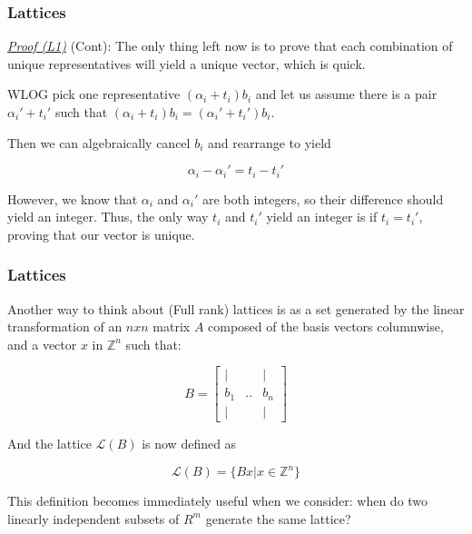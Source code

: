 \documentclass{beamer}
\begin{document}
\begin{frame}
\frametitle{Lattices}
\underline{\textit{Proof (L1)}} (Cont): The only thing left now is to prove that each combination of unique representatives will yield a unique vector, which is quick.

\vspace{1em}

WLOG pick one representative $(\alpha_i + t_i) b_i$ and let us assume there is a pair $\alpha_i' + t_i'$ such that $(\alpha_i + t_i) b_i = (\alpha_i' + t_i') b_i$.

\vspace{1em}

Then we can algebraically cancel $b_i$ and rearrange to yield

\[ \alpha_i - \alpha_i' = t_i - t_i' \]

However, we know that $\alpha_i$ and $\alpha_i'$ are both integers, so their difference should yield an integer. Thus, the only way $t_i$ and $t_i'$ yield an integer is if $t_i = t_i'$, proving that our vector is unique.

\end{frame}


\begin{frame}
\frametitle{Lattices}

Another way to think about (Full rank) lattices is as a set generated by the linear transformation of an $nxn$ matrix $A$ composed of the basis vectors columnwise, and a vector $x$ in $\mathbb{Z}^n$ such that:

\[ B = \begin{bmatrix}
| & & | \\
b_1 & .. & b_n \\
| & & |
\end{bmatrix}
\]

And the lattice $\mathcal{L}(B)$ is now defined as

\[ \mathcal{L}(B) = \{ Bx | x \in \mathbb{Z}^n\} \]

This definition becomes immediately useful when we consider: when do two linearly independent subsets of $R^m$ generate the same lattice?

\end{frame}
\end{document}
